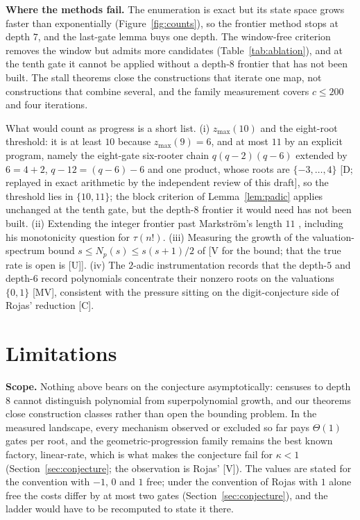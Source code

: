 \documentclass[11pt]{article}
\theoremstyle{definition}
\theoremstyle{remark}
\newcommand{\zmax}{z_{\max}}
\begin{document}
\textbf{Where the methods fail.} The enumeration is exact but its state space grows faster than
exponentially (Figure~\ref{fig:counts}), so the frontier method stops at depth $7$, and the last-gate lemma
buys one depth. The window-free criterion removes the window but admits more candidates (Table~\ref{tab:ablation}),
and at the tenth gate it cannot be applied without a depth-$8$ frontier that has not been built. The
stall theorems close the constructions that iterate one map, not constructions that combine several, and the
family measurement covers $c \le 200$ and four iterations.

What would count as progress is a short list. (i) $\zmax(10)$ and the eight-root threshold: it is at least
$10$ because $\zmax(9) = 6$, and at most $11$ by an explicit program, namely the eight-gate
six-rooter chain $q(q-2)(q-6)$ extended by $6 = 4 + 2$, $q - 12 = (q-6) - 6$ and one product, whose roots are
$\{-3,\dots,4\}$ [D; replayed in exact arithmetic by the independent review of this draft], so the threshold lies
in $\{10, 11\}$; the block criterion of Lemma~\ref{lem:padic} applies unchanged at the tenth gate, but the depth-$8$ frontier
it would need has not been built. (ii) Extending the integer frontier past Markstr\"om's length $11$
\cite{Markstrom2014}, including his monotonicity question for $\tau(n!)$. (iii) Measuring the growth of
the valuation-spectrum bound $s \le N_p(s) \le s(s+1)/2$ of \cite{Rojas2003} [V for the bound; that the
true rate is open is [U]]. (iv) The $2$-adic instrumentation records that the depth-$5$ and depth-$6$ record
polynomials concentrate their nonzero roots on the valuations $\{0, 1\}$ [MV], consistent with the pressure
sitting on the digit-conjecture side of Rojas' reduction [C].

\section{Limitations}\label{sec:limitations}

\textbf{Scope.} Nothing above bears on the conjecture asymptotically: censuses to depth $8$ cannot
distinguish polynomial from superpolynomial growth, and our theorems close construction classes rather
than open the bounding problem. In the measured landscape, every mechanism observed or excluded so far pays
$\Theta(1)$ gates per root, and the geometric-progression family remains the best known factory, linear-rate,
which is what makes the conjecture fail for $\kappa < 1$ (Section~\ref{sec:conjecture}; the observation is
Rojas' [V]). The values are stated for the convention with $-1$, $0$ and $1$ free; under the convention of
Rojas with $1$ alone free the costs differ by at most two gates (Section~\ref{sec:conjecture}), and the
ladder would have to be recomputed to state it there.
\end{document}
